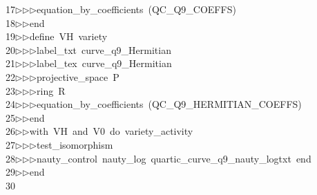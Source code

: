 \begin{tabbing}
17\>$\triangleright$\>$\triangleright$\>$\triangleright$\>equation\_by\_coefficients\ (QC\_Q9\_COEFFS)\ \\[0pt]
18\>$\triangleright$\>$\triangleright$\>end\ \\[0pt]
19\>$\triangleright$\>$\triangleright$\>define\ VH\ variety\ \\[0pt]
20\>$\triangleright$\>$\triangleright$\>$\triangleright$\>label\_txt\ curve\_q9\_Hermitian\ \\[0pt]
21\>$\triangleright$\>$\triangleright$\>$\triangleright$\>label\_tex\ curve\_q9\_Hermitian\ \\[0pt]
22\>$\triangleright$\>$\triangleright$\>$\triangleright$\>projective\_space\ P\ \\[0pt]
23\>$\triangleright$\>$\triangleright$\>$\triangleright$\>ring\ R\ \\[0pt]
24\>$\triangleright$\>$\triangleright$\>$\triangleright$\>equation\_by\_coefficients\ (QC\_Q9\_HERMITIAN\_COEFFS)\ \\[0pt]
25\>$\triangleright$\>$\triangleright$\>end\ \\[0pt]
26\>$\triangleright$\>$\triangleright$\>with\ VH\ and\ V0\ do\ variety\_activity\ \\[0pt]
27\>$\triangleright$\>$\triangleright$\>$\triangleright$\>test\_isomorphism\ \\[0pt]
28\>$\triangleright$\>$\triangleright$\>$\triangleright$\>nauty\_control\ nauty\_log\ quartic\_curve\_q9\_nauty\_logtxt\ end\ \\[0pt]
29\>$\triangleright$\>$\triangleright$\>end\\[0pt]
30\>\end{tabbing}
